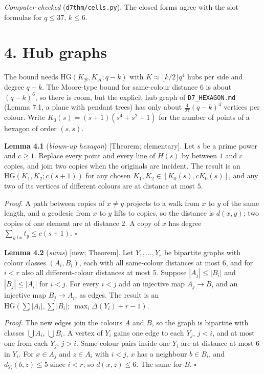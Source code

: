 \documentclass[
  10pt,
]{article}
\begin{document}
\emph{Computer-checked} (\texttt{d7thm/cells.py}). The closed forms
agree with the slot formulas for \(q\le37\), \(k\le6\).

\hypertarget{hub-graphs}{%
\section{4. Hub graphs}\label{hub-graphs}}

The bound needs \(\mathrm{HG}(K_{\mathcal B},K_{\mathcal A};q-k)\) with
\(K\approx\lfloor k/2\rfloor q^4\) hubs per side and degree \(q-k\). The
Moore-type bound for same-colour distance \(6\) is about \((q-k)^6\), so
there is room, but the explicit hub graph of \texttt{D7\_HEXAGON.md}
(Lemma 7.1, a plane with pendant trees) has only about
\(\frac4{27}(q-k)^4\) vertices per colour. Write
\(K_0(s)=(s+1)(s^4+s^2+1)\) for the number of points of a hexagon of
order \((s,s)\).

\textbf{Lemma 4.1} (\emph{blown-up hexagon}) {[}Theorem; elementary{]}.
Let \(s\) be a prime power and \(c\ge1\). Replace every point and every
line of \(H(s)\) by between \(1\) and \(c\) copies, and join two copies
when the originals are incident. The result is an
\(\mathrm{HG}(K_1,K_2;c(s+1))\) for any chosen
\(K_1,K_2\in[K_0(s),cK_0(s)]\), and any two of its vertices of different
colours are at distance at most \(5\).

\emph{Proof.} A path between copies of \(x\neq y\) projects to a walk
from \(x\) to \(y\) of the same length, and a geodesic from \(x\) to
\(y\) lifts to copies, so the distance is \(d(x,y)\); two copies of one
element are at distance \(2\). A copy of \(x\) has degree
\(\sum_{y\ \mathrm I\ x}t_y\le c(s+1)\). \(\square\)

\textbf{Lemma 4.2} (\emph{sums}) {[}new; Theorem{]}. Let
\(Y_1,\dots,Y_r\) be bipartite graphs with colour classes \((A_i,B_i)\),
each with all same-colour distances at most \(6\), and for \(i<r\) also
all different-colour distances at most \(5\). Suppose \(|A_j|\le|B_i|\)
and \(|B_j|\le|A_i|\) for \(i<j\). For every \(i<j\) add an injective
map \(A_j\to B_i\) and an injective map \(B_j\to A_i\), as edges. The
result is an
\(\mathrm{HG}(\sum|A_i|,\sum|B_i|;\ \max_i\Delta(Y_i)+r-1)\).

\emph{Proof.} The new edges join the colours \(A\) and \(B\), so the
graph is bipartite with classes \(\bigcup A_i\), \(\bigcup B_i\). A
vertex of \(Y_i\) gains one edge to each \(Y_j\), \(j<i\), and at most
one from each \(Y_j\), \(j>i\). Same-colour pairs inside one \(Y_i\) are
at distance at most \(6\) in \(Y_i\). For \(x\in A_j\) and \(z\in A_i\)
with \(i<j\), \(x\) has a neighbour \(b\in B_i\), and
\(d_{Y_i}(b,z)\le5\) since \(i<r\); so \(d(x,z)\le6\). The same for
\(B\). \(\square\)
\end{document}

